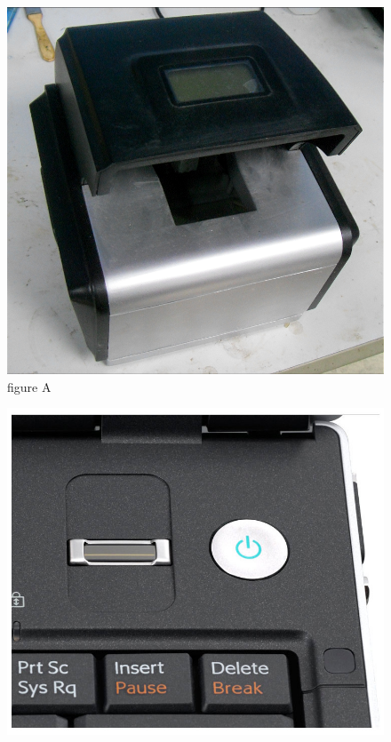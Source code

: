 \documentclass{beamer}
\begin{document}
\begin{frame}
\frametitle{\subsecname}
  \begin{columns}
    \begin{overprint}
      \begin{figure}
      \includegraphics[width=\textwidth]{image/test-image1}
      \caption{figure A}
      \end{figure}
      \begin{figure}
      \includegraphics[width=\textwidth]{image/test-image2}

\end{figure}
\end{overprint}
\end{columns}
\end{frame}
\end{document}
